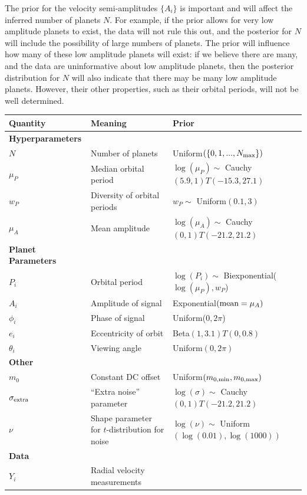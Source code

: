 \documentclass[useAMS,usenatbib]{mn2e}
\begin{document}
The prior for the velocity semi-amplitudes $\{A_i\}$ is important and will affect the
inferred number of planets $N$. For example, if the prior allows for very
low amplitude planets to exist, the data will not rule this out, and the posterior
for $N$ will include the possibility of large numbers of planets. The prior
will influence how many of these low amplitude planets will exist: if we
believe there are many, and the data are uninformative about low amplitude
planets, then the posterior distribution for $N$ will also indicate that there
may be many low amplitude planets. However, their other properties, such as
their orbital periods, will not be well determined.

\begin{table}
\begin{tabular}{|l|l|l|}
\hline
Quantity	&	Meaning		& Prior\\
\hline
{\bf Hyperparameters}	&	\\
$N$		& Number of planets	& Uniform$(\{0, 1, ..., N_{\rm max}\})$\\
$\mu_P$		&	Median orbital period	& $\log(\mu_P) \sim$ Cauchy$(5.9, 1)T(-15.3, 27.1)$\\
$w_P$		&	Diversity of orbital periods & $w_P \sim$ Uniform$(0.1, 3)$\\
$\mu_A$		&	Mean amplitude	& $\log(\mu_A) \sim$ Cauchy$(0, 1)T(-21.2, 21.2)$\\
\hline
{\bf Planet Parameters}\\
$P_i$		&	Orbital period	&	$\log(P_i) \sim $ Biexponential($\log(\mu_P), w_P$)\\
$A_i$		&	Amplitude of signal	& Exponential$(\textnormal{mean}=\mu_A)$\\
$\phi_i$	&	Phase of signal	&	Uniform($0, 2\pi$)\\
$e_i$		&	Eccentricity of orbit	&	Beta$(1, 3.1)T(0, 0.8)$\\
$\theta_i$	&	Viewing angle	&	Uniform$(0, 2\pi)$\\
\hline
{\bf Other}\\
$m_0$		&	Constant DC offset	&	Uniform$(m_{0, \rm min}, m_{0, \rm max})$\\
$\sigma_{\rm extra}$	& ``Extra noise'' parameter	& $\log(\sigma) \sim$ Cauchy$(0, 1)T(-21.2, 21.2)$\\
$\nu$		& Shape parameter for $t$-distribution for noise & $\log(\nu) \sim$ Uniform$(\log(0.01), \log(1000))$\\
\hline
{\bf Data}\\
$Y_i$		& Radial velocity measurements	&

\end{tabular}
\end{table}
\end{document}
